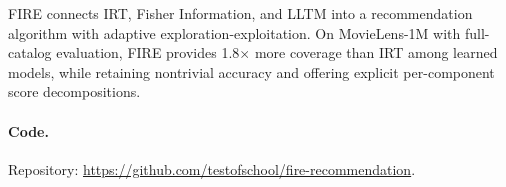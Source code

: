 \documentclass[11pt,a4paper]{article}
\begin{document}
FIRE connects IRT, Fisher Information, and LLTM into a recommendation algorithm with adaptive exploration-exploitation. On MovieLens-1M with full-catalog evaluation, FIRE provides 1.8$\times$ more coverage than IRT among learned models, while retaining nontrivial accuracy and offering explicit per-component score decompositions.

\paragraph{Code.} Repository: \url{https://github.com/testofschool/fire-recommendation}.



\end{document}
